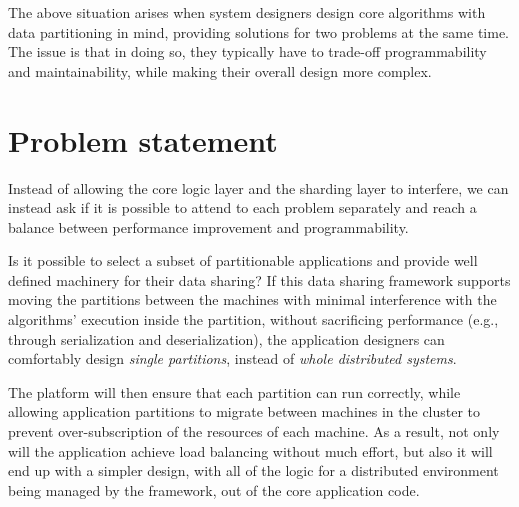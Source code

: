 The above situation arises when system designers design
core algorithms with data partitioning in mind, providing solutions for two
problems at the same time. The issue is that in doing so, they typically have to
trade-off programmability and maintainability, while making their overall design
more complex.

\section{Problem statement}
Instead of allowing the core logic layer and the sharding layer to interfere,
we can instead ask if it is possible to attend to each problem separately and
reach a balance between performance improvement and programmability.

Is it possible to select a subset of partitionable applications
and provide well defined machinery for their data sharing? If this data sharing
framework supports moving the partitions between the machines with minimal
interference with the algorithms' execution inside the partition, without
sacrificing performance (e.g., through serialization and deserialization), the
application designers can comfortably design \emph{single partitions}, instead
of \emph{whole distributed systems}.

The platform will then ensure that each partition can run correctly, while
allowing application partitions to migrate between machines in the cluster
to prevent over-subscription of the resources of each machine. As a result,
not only will the application achieve load balancing without
much effort,
but also it will end up with a simpler design, with all
of the logic for a distributed environment being managed by the framework,
out of the core application code.

